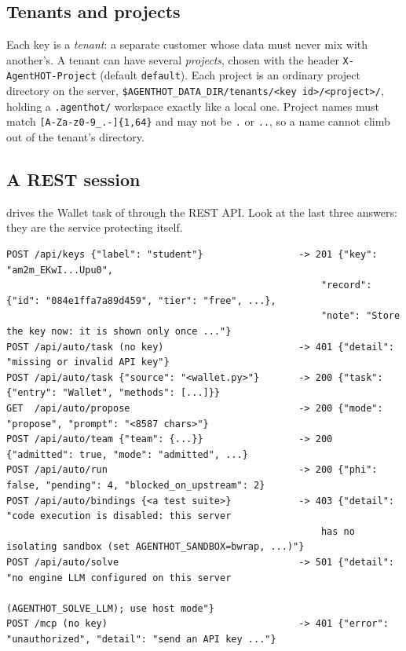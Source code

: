 \documentclass[10pt,a4paper]{article}
\newcommand{\code}[1]{\texttt{#1}}
\newcommand{\file}[1]{\texttt{#1}}
\begin{document}
\subsection{Tenants and projects}

Each key is a \emph{tenant}: a separate customer whose data must never mix
with another's. A tenant can have several \emph{projects}, chosen with the
header \code{X-AgentHOT-Project} (default \code{default}). Each project is an
ordinary project directory on the server,
\file{\$AGENTHOT\_DATA\_DIR/tenants/<key id>/<project>/}, holding a
\file{.agenthot/} workspace exactly like a local one. Project names must match
\code{[A-Za-z0-9\_.-]\{1,64\}} and may not be \code{.} or \code{..}, so a name
cannot climb out of the tenant's directory.

\subsection{A REST session}

 drives the Wallet task of  through the REST
API. Look at the last three answers: they are the service protecting itself.

\begin{lstlisting}[style=engine, caption={Observed: a REST session against the service (abridged).}, label={lst:rest}]
POST /api/keys {"label": "student"}                 -> 201 {"key": "am2m_EKwI...Upu0",
                                                        "record": {"id": "084e1ffa7a89d459", "tier": "free", ...},
                                                        "note": "Store the key now: it is shown only once ..."}
POST /api/auto/task (no key)                        -> 401 {"detail": "missing or invalid API key"}
POST /api/auto/task {"source": "<wallet.py>"}       -> 200 {"task": {"entry": "Wallet", "methods": [...]}}
GET  /api/auto/propose                              -> 200 {"mode": "propose", "prompt": "<8587 chars>"}
POST /api/auto/team {"team": {...}}                 -> 200 {"admitted": true, "mode": "admitted", ...}
POST /api/auto/run                                  -> 200 {"phi": false, "pending": 4, "blocked_on_upstream": 2}
POST /api/auto/bindings {<a test suite>}            -> 403 {"detail": "code execution is disabled: this server
                                                        has no isolating sandbox (set AGENTHOT_SANDBOX=bwrap, ...)"}
POST /api/auto/solve                                -> 501 {"detail": "no engine LLM configured on this server
                                                        (AGENTHOT_SOLVE_LLM); use host mode"}
POST /mcp (no key)                                  -> 401 {"error": "unauthorized", "detail": "send an API key ..."}
\end{lstlisting}
\end{document}

